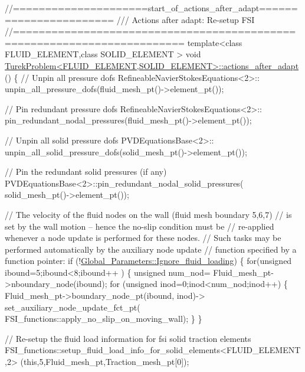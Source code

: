 \begin{DoxyCodeInclude}
\textcolor{comment}{//=====================start\_of\_actions\_after\_adapt=======================}
\textcolor{comment}{///  Actions after adapt: Re-setup FSI}
\textcolor{comment}{}\textcolor{comment}{//========================================================================}
\textcolor{keyword}{template}<\textcolor{keyword}{class} FLUID\_ELEMENT,\textcolor{keyword}{class} SOLID\_ELEMENT >
\textcolor{keywordtype}{void} \hyperlink{classTurekProblem_a39df0332d7606a5befe89bb0e581184b}{TurekProblem<FLUID\_ELEMENT,SOLID\_ELEMENT>::actions\_after\_adapt}
      ()
\{
 \textcolor{comment}{// Unpin all pressure dofs}
 RefineableNavierStokesEquations<2>::
  unpin\_all\_pressure\_dofs(fluid\_mesh\_pt()->element\_pt());
 
 \textcolor{comment}{// Pin redundant pressure dofs}
 RefineableNavierStokesEquations<2>::
  pin\_redundant\_nodal\_pressures(fluid\_mesh\_pt()->element\_pt());

 \textcolor{comment}{// Unpin all solid pressure dofs}
 PVDEquationsBase<2>::
  unpin\_all\_solid\_pressure\_dofs(solid\_mesh\_pt()->element\_pt());
 
 \textcolor{comment}{// Pin the redundant solid pressures (if any)}
 PVDEquationsBase<2>::pin\_redundant\_nodal\_solid\_pressures(
  solid\_mesh\_pt()->element\_pt());


 \textcolor{comment}{// The velocity of the fluid nodes on the wall (fluid mesh boundary 5,6,7)}
 \textcolor{comment}{// is set by the wall motion -- hence the no-slip condition must be}
 \textcolor{comment}{// re-applied whenever a node update is performed for these nodes. }
 \textcolor{comment}{// Such tasks may be performed automatically by the auxiliary node update }
 \textcolor{comment}{// function specified by a function pointer:}
 \textcolor{keywordflow}{if} (!\hyperlink{namespaceGlobal__Parameters_aac13d615d2acd78d22a3137ffd62f7aa}{Global\_Parameters::Ignore\_fluid\_loading})
  \{
   \textcolor{keywordflow}{for}(\textcolor{keywordtype}{unsigned} ibound=5;ibound<8;ibound++ )
    \{ 
     \textcolor{keywordtype}{unsigned} num\_nod= Fluid\_mesh\_pt->nboundary\_node(ibound);
     \textcolor{keywordflow}{for} (\textcolor{keywordtype}{unsigned} inod=0;inod<num\_nod;inod++)
      \{   
       Fluid\_mesh\_pt->boundary\_node\_pt(ibound, inod)->
        set\_auxiliary\_node\_update\_fct\_pt(
         FSI\_functions::apply\_no\_slip\_on\_moving\_wall);
      \}
    \}
 

   \textcolor{comment}{// Re-setup the fluid load information for fsi solid traction elements}
   FSI\_functions::setup\_fluid\_load\_info\_for\_solid\_elements<FLUID\_ELEMENT,2>
    (\textcolor{keyword}{this},5,Fluid\_mesh\_pt,Traction\_mesh\_pt[0]); 
   

\end{DoxyCodeInclude}
